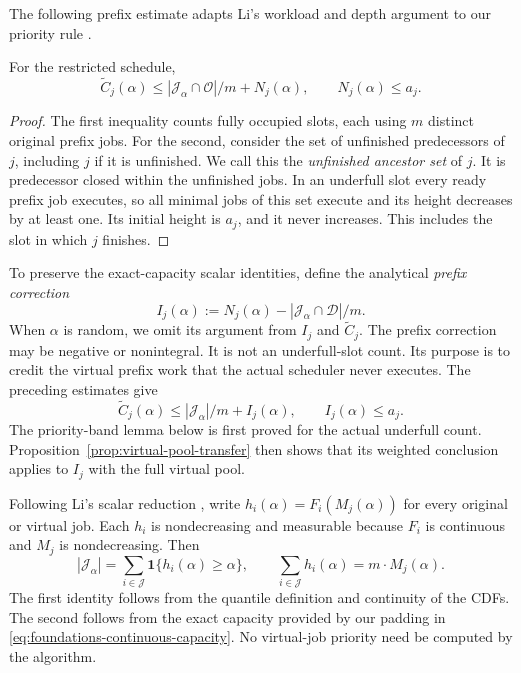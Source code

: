 The following prefix estimate adapts Li's workload and depth argument to
our priority rule \cite[Lemma~3.2]{Li2017}.

\begin{lemma}
\label{lem:prefix-work-height}
For the restricted schedule,
\[
 \widetilde C_j(\alpha)\le |\mathcal J_\alpha\cap\mathcal O|/m+N_j(\alpha),
 \qquad N_j(\alpha)\le a_j.
\]
\end{lemma}
\begin{proof}
The first inequality counts fully occupied slots, each using $m$
distinct original prefix jobs. For the second, consider the set of
unfinished predecessors of $j$, including $j$ if it is unfinished.
We call this the \emph{unfinished ancestor set} of $j$. It is predecessor closed
within the unfinished jobs. In an underfull slot every ready prefix job
executes, so all minimal jobs of this set execute and its height decreases
by at least one.
Its initial height is $a_j$, and it never increases. This includes
the slot in which $j$ finishes.
\end{proof}

To preserve the exact-capacity scalar identities, define the analytical
\emph{prefix correction}
\[
 I_j(\alpha):=N_j(\alpha)-|\mathcal J_\alpha\cap\mathcal D|/m.
\]
When $\alpha$ is random, we omit its argument from $I_j$ and
$\widetilde C_j$.
The prefix correction may be negative or nonintegral. It is not an underfull-slot
count. Its purpose is to credit the virtual prefix work that the actual
scheduler never executes. The preceding estimates give
\begin{equation}
 \widetilde C_j(\alpha)\le |\mathcal J_\alpha|/m+I_j(\alpha),
 \qquad I_j(\alpha)\le a_j.
 \label{eq:foundations-prefix-bound}
\end{equation}
The priority-band lemma below is first proved for the actual underfull
count. Proposition~\ref{prop:virtual-pool-transfer} then shows that its
weighted conclusion applies to $I_j$ with the full virtual pool.

Following Li's scalar reduction \cite[Section~3]{Li2017}, write
$h_i(\alpha)=F_i(M_j(\alpha))$ for every original or virtual job. Each
$h_i$ is nondecreasing and measurable because $F_i$ is continuous and
$M_j$ is nondecreasing. Then
\begin{equation}
 |\mathcal J_\alpha|=\sum_{i\in\mathcal J}
       \mathbf1\{h_i(\alpha)\ge\alpha\},\qquad
 \sum_{i\in\mathcal J}h_i(\alpha)=m\cdot M_j(\alpha).
 \label{eq:foundations-h-identities}
\end{equation}
The first identity follows from the quantile definition and continuity
of the CDFs. The second follows from the exact capacity provided by our
padding in \eqref{eq:foundations-continuous-capacity}. No virtual-job priority need be
computed by the algorithm.
